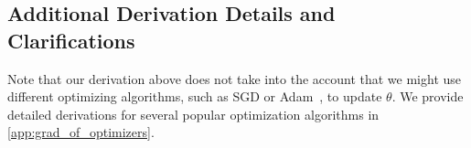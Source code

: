 

\subsection{Additional Derivation Details and Clarifications}
Note that our derivation above does not take into the account that we might use different optimizing algorithms, such as SGD or Adam~\citep{adam}, to update $\theta$. We provide detailed derivations for several popular optimization algorithms in \autoref{app:grad_of_optimizers}.     

